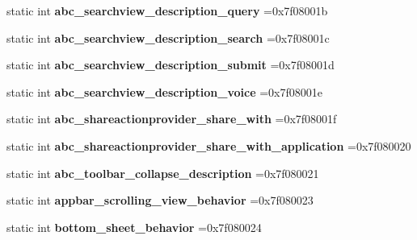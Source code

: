 \begin{DoxyCompactItemize}
static int {\bfseries abc\+\_\+searchview\+\_\+description\+\_\+query} =0x7f08001b
\item 
\mbox{\label{classandroid_1_1support_1_1v4_1_1R_1_1string_a5abbe01ccc39ce17d03dc5c85a237f4b}} 
static int {\bfseries abc\+\_\+searchview\+\_\+description\+\_\+search} =0x7f08001c
\item 
\mbox{\label{classandroid_1_1support_1_1v4_1_1R_1_1string_a1fb41dc30c762c5e276bb404130b6357}} 
static int {\bfseries abc\+\_\+searchview\+\_\+description\+\_\+submit} =0x7f08001d
\item 
\mbox{\label{classandroid_1_1support_1_1v4_1_1R_1_1string_a8b9c093a9a58efc4996f54ad300ab507}} 
static int {\bfseries abc\+\_\+searchview\+\_\+description\+\_\+voice} =0x7f08001e
\item 
\mbox{\label{classandroid_1_1support_1_1v4_1_1R_1_1string_a6533b5142ac88cfa1f3e4c035e381e8c}} 
static int {\bfseries abc\+\_\+shareactionprovider\+\_\+share\+\_\+with} =0x7f08001f
\item 
\mbox{\label{classandroid_1_1support_1_1v4_1_1R_1_1string_afa14ebdd4927febf241c6789b7b88646}} 
static int {\bfseries abc\+\_\+shareactionprovider\+\_\+share\+\_\+with\+\_\+application} =0x7f080020
\item 
\mbox{\label{classandroid_1_1support_1_1v4_1_1R_1_1string_a777e05f2dceb405628b951566cf52cc9}} 
static int {\bfseries abc\+\_\+toolbar\+\_\+collapse\+\_\+description} =0x7f080021
\item 
\mbox{\label{classandroid_1_1support_1_1v4_1_1R_1_1string_a4a4e6e40e6ec47db23bef5f6e82ea229}} 
static int {\bfseries appbar\+\_\+scrolling\+\_\+view\+\_\+behavior} =0x7f080023
\item 
\mbox{\label{classandroid_1_1support_1_1v4_1_1R_1_1string_aa0f57c03fce2f3ea7fd51546c3c36fda}} 
static int {\bfseries bottom\+\_\+sheet\+\_\+behavior} =0x7f080024

\end{DoxyCompactItemize}
